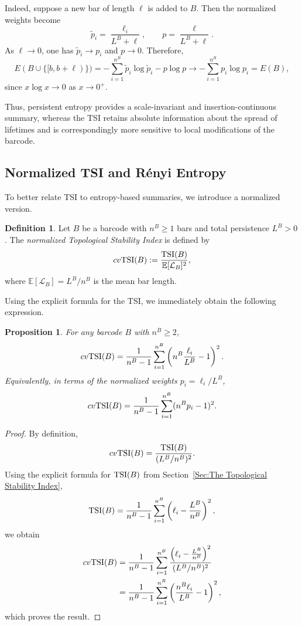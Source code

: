 \documentclass[11pt]{amsart}
\newtheorem{prop}{Proposition}[section]
\theoremstyle{definition}
\newtheorem{definition}{Definition}[section]
\newcommand{\tsi}[0]{\textup{TSI}}
\begin{document}
Indeed, suppose a new bar of length $\ell$ is added to $B$. Then the normalized weights become
\[
\tilde p_i=\frac{\ell_i}{L^B+\ell},
\qquad
p=\frac{\ell}{L^B+\ell}.
\]
As $\ell\to 0$, one has $\tilde p_i\to p_i$ and $p\to 0$. Therefore,
\[
E(B\cup\{[b,b+\ell)\})
=
-\sum_{i=1}^{n^B}\tilde p_i\log \tilde p_i - p\log p
\longrightarrow
-\sum_{i=1}^{n^B}p_i\log p_i
=
E(B),
\]
since $x\log x\to 0$ as $x\to 0^+$.

Thus, persistent entropy provides a scale-invariant and insertion-continuous summary, whereas the TSI retains absolute information about the spread of lifetimes and is correspondingly more sensitive to local modifications of the barcode.




\subsection{Normalized TSI and Rényi Entropy}

To better relate TSI to entropy-based summaries, we introduce a normalized version.

\begin{definition}
Let $B$ be a barcode with $n^B\geq 1$ bars and total persistence $L^B>0$. The \emph{normalized Topological Stability Index} is defined by
\begin{equation}
cv\tsi(B):=\frac{\tsi(B)}{\mathbb{E}[\mathcal L_B]^2},
\end{equation}
where $\mathbb{E}[\mathcal L_B]=L^B/n^B$ is the mean bar length.
\end{definition}

Using the explicit formula for the TSI, we immediately obtain the following expression.

\begin{prop}\label{prop:cvtsi_explicit}
For any barcode $B$ with $n^B\geq 2$,
\begin{equation}
cv\tsi(B)
=
\frac{1}{n^B-1}\sum_{i=1}^{n^B}\left(n^B\frac{\ell_i}{L^B}-1\right)^2.
\end{equation}
Equivalently, in terms of the normalized weights $p_i=\ell_i/L^B$,
\begin{equation}
cv\tsi(B)
=
\frac{1}{n^B-1}\sum_{i=1}^{n^B}(n^Bp_i-1)^2.
\end{equation}
\end{prop}

\begin{proof}
By definition,
\[
cv\tsi(B)
=
\frac{\tsi(B)}{(L^B/n^B)^2}.
\]
Using the explicit formula for $\tsi(B)$ from Section~\ref{Sec:The Topological Stability Index},
\[
\tsi(B)
=
\frac{1}{n^B-1}\sum_{i=1}^{n^B}\left(\ell_i-\frac{L^B}{n^B}\right)^2,
\]
we obtain
\begin{align*}
cv\tsi(B)
&=
\frac{1}{n^B-1}
\sum_{i=1}^{n^B}
\frac{\left(\ell_i-\frac{L^B}{n^B}\right)^2}{(L^B/n^B)^2}\\
&=
\frac{1}{n^B-1}
\sum_{i=1}^{n^B}
\left(\frac{n^B\ell_i}{L^B}-1\right)^2,
\end{align*}
which proves the result.
\end{proof}
\end{document}
